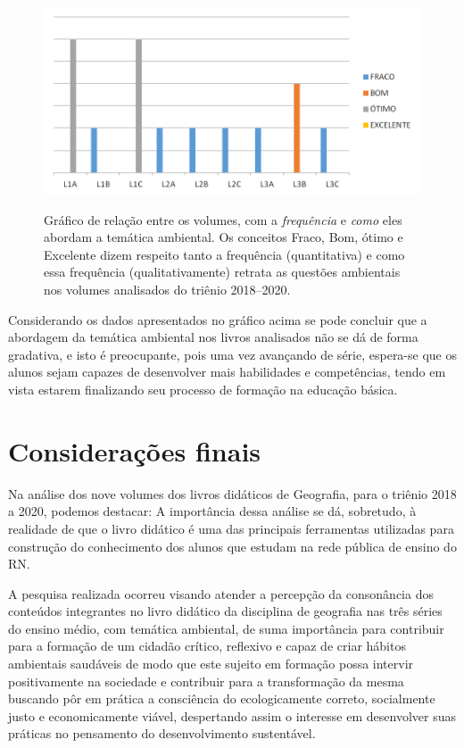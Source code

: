 \begin{refsection}
    \begin{figure}[ht]%
        \centering%
        \caption{Gráfico de relação entre os volumes, com a \textit{frequência} e \textit{como} eles abordam a temática ambiental. Os conceitos Fraco, Bom, ótimo e Excelente dizem respeito tanto a frequência (quantitativa) e como essa frequência (qualitativamente) retrata as questões ambientais nos volumes analisados do triênio 2018--2020.}%
        \includegraphics[width=4.625in]{articles/13-educacao-ambiental-n/fig1.png}%
        \label{fig:grafico-freq}%
    \end{figure}%

    Considerando os dados apresentados no gráfico acima se pode concluir que a abordagem da temática ambiental nos livros analisados não se dá de forma gradativa, e isto é preocupante, pois uma vez avançando de série, espera-se que os alunos sejam capazes de desenvolver mais habilidades e competências, tendo em vista estarem finalizando seu processo de formação na educação básica.  


    \section{Considerações finais}

    Na análise dos nove volumes dos livros didáticos de Geografia, para o triênio 2018 a 2020, podemos destacar: A importância dessa análise se dá, sobretudo, à realidade de que o livro didático é uma das principais ferramentas utilizadas para construção do conhecimento dos alunos que estudam na rede pública de ensino do RN.

    A pesquisa realizada ocorreu visando atender a percepção da consonância dos conteúdos integrantes no livro didático da disciplina de geografia nas três séries do ensino médio, com temática ambiental, de suma importância para contribuir para a formação de um cidadão crítico, reflexivo e capaz de criar hábitos ambientais saudáveis de modo que este sujeito em formação possa intervir positivamente na sociedade e contribuir para a transformação da mesma buscando pôr em prática a consciência do ecologicamente correto, socialmente justo e economicamente viável, despertando assim o interesse em desenvolver suas práticas no pensamento do desenvolvimento sustentável.  


\end{refsection}
